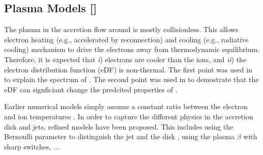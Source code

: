 \documentclass[twocolumn,tighten,dvipsnames,linenumbers]{aastex63}
\newcommand\ckc[1]{{\color{MidnightBlue}[ckc: #1]}}
\begin{document}


\subsection{Plasma Models
  []}
\label{sec:eDF}

The plasma in the accretion flow around \sgra is mostly collisionless.
This allows electron heating (e.g., accelerated by reconnection) and
cooling (e.g., radiative cooling) mechanism to drive the electrons
away from thermodynamic equilibrium.
Therefore, it is expected that \emph{i}) electrons are cooler than the
ions, and \emph{ii}) the electron distribution function (eDF) is
non-thermal.
The first point was used in \citet{1998ApJ...492..554N} to explain the
spectrum of \sgra.
The second point was used in \citep{2000ApJ...541..234O} to demostrate
that the eDF can signficiant change the predcited properties of \sgra.

Earlier numerical models simply assume a constant ratio between the
electron and ion temperatures \citep{...}.
In order to capture the different physics in the accretion disk and
jets, refined models have been proposed.
This includes using the Bernoulli parameter to distinguish the jet and
the disk \citep{2014A&A...570A...7M}, using the plasma $\beta$
\citep{2015ApJ...799....1C, 2015ApJ...812..103C} with sharp switches, ...
\end{document}
